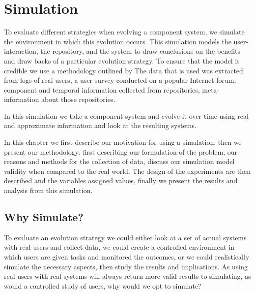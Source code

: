 \chapter{Simulation}
\label{simulation}
{}To evaluate different strategies when evolving a component system, we simulate the environment in which this evolution occurs.
{}This simulation models the user-interaction, the repository, and the system
{}to draw conclusions on the benefits and draw backs of a particular evolution strategy.
{}To ensure that the model is credible we use a methodology outlined by \cite{Law2005}
{}The data that is used was extracted from logs of real users, a user survey conducted on a popular Internet forum, 
{}component and temporal information collected from repositories, meta-information about those repositories.

{}In this simulation we take a component system and evolve it over time using real and approximate information and look at the resulting systems.

{}In this chapter we first describe our motivation for using a simulation,
{}then we present our methodology;
{}first describing our formulation of the problem,
{}our reasons and methods for the collection of data,
{}discuss our simulation model validity when compared to the real world.
{}The design of the experiments are then described and the variables assigned values,
{}finally we present the results and analysis from this simulation.
 
\section{Why Simulate?}
To evaluate an evolution strategy we could either look at a set of actual systems with real users and collect data,
we could create a controlled environment in which users are given tasks and monitored the outcomes,
or we could realistically simulate the necessary aspects, then study the results and implications.
As using real users with real systems will always return more valid results to simulating, as would a controlled study of users,
why would we opt to simulate?


